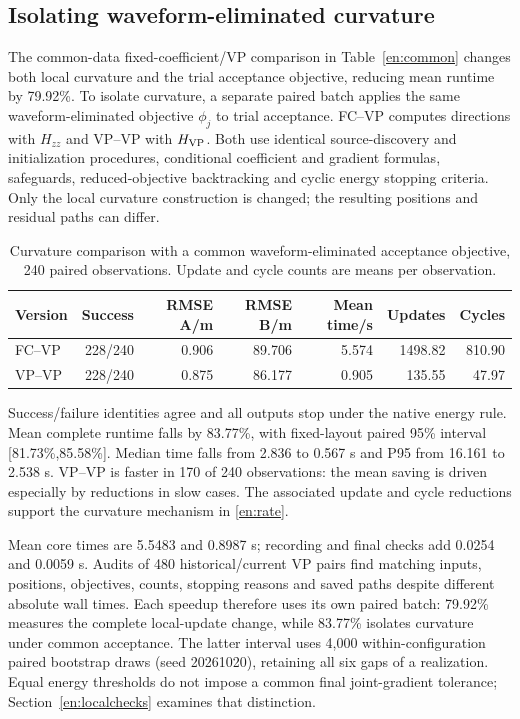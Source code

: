 \documentclass[a4paper,fleqn,review]{cas-sc}
\begin{document}
\FloatBarrier
\subsection{Isolating waveform-eliminated curvature}
The common-data fixed-coefficient/VP comparison in Table~\ref{en:common} changes both local curvature and the trial acceptance objective, reducing mean runtime by 79.92\%. To isolate curvature, a separate paired batch applies the same waveform-eliminated objective $\phi_j$ to trial acceptance. FC--VP computes directions with $H_{zz}$ and VP--VP with $H_{\rm VP}$. Both use identical source-discovery and initialization procedures, conditional coefficient and gradient formulas, safeguards, reduced-objective backtracking and cyclic energy stopping criteria. Only the local curvature construction is changed; the resulting positions and residual paths can differ.
\begin{table}[pos=H]\centering\small
\caption{Curvature comparison with a common waveform-eliminated acceptance objective, 240 paired observations. Update and cycle counts are means per observation.}\label{en:curvaturetable}
\begin{tabular}{@{}lrrrrrr@{}}\toprule
Version & Success & RMSE A/m & RMSE B/m & Mean time/s & Updates & Cycles\\\midrule
FC--VP & 228/240 & 0.906 & 89.706 & 5.574 & 1498.82 & 810.90\\
VP--VP & 228/240 & 0.875 & 86.177 & 0.905 & 135.55 & 47.97\\\bottomrule
\end{tabular}\end{table}
Success/failure identities agree and all outputs stop under the native energy rule. Mean complete runtime falls by 83.77\%, with fixed-layout paired 95\% interval [81.73\%,85.58\%]. Median time falls from 2.836 to 0.567 s and P95 from 16.161 to 2.538 s. VP--VP is faster in 170 of 240 observations: the mean saving is driven especially by reductions in slow cases. The associated update and cycle reductions support the curvature mechanism in \eqref{en:rate}.

Mean core times are 5.5483 and 0.8987 s; recording and final checks add 0.0254 and 0.0059 s. Audits of 480 historical/current VP pairs find matching inputs, positions, objectives, counts, stopping reasons and saved paths despite different absolute wall times. Each speedup therefore uses its own paired batch: 79.92\% measures the complete local-update change, while 83.77\% isolates curvature under common acceptance. The latter interval uses 4,000 within-configuration paired bootstrap draws (seed 20261020), retaining all six gaps of a realization. Equal energy thresholds do not impose a common final joint-gradient tolerance; Section~\ref{en:localchecks} examines that distinction.
\end{document}
